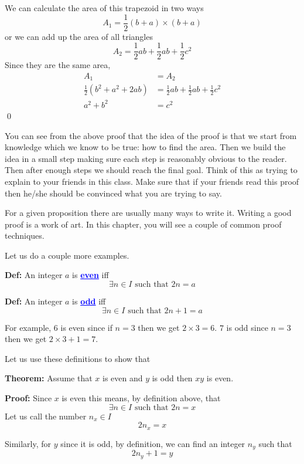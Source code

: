 \documentclass[a4paper, 12pt]{article}
\newcommand{\half}{\frac{1}{2}}
\newcommand{\definition}{\noindent\textbf{Def:} }
\newcommand{\theorem}{\noindent\textbf{Theorem:} }
\renewcommand{\proof}{\noindent\textbf{Proof:} }
\newcommand{\qedd}{\qed\newline}
\newcommand{\kwd}[1]{\textcolor{blue}{\textbf{\underline{#1}}}}
\newcommand{\st}{\text{ such that }}
\theoremstyle{examplestyle}
\begin{document}
\begin{multicols}{2}
\begin{center}
	\end{center}
	
	We can calculate the area of this trapezoid in two ways
	\[
		A_1 = \half(b+a)\times(b+a)
	\]
	or we can add up the area of all triangles
	\[
		A_2 = \half a b + \half a b + \half c^2
	\]
	Since they are the same area,
	\begin{align}
		A_1 &= A_2 \\
		\half\left(b^2 + a^2 +2ab\right) &= \half ab + \half ab + \half c^2\\
		a^2 + b^2 &= c^2
	\end{align}
	\qedd
	
You can see from the above proof that the idea of the proof is that we start from knowledge which we know to be true: how to find the area. Then we build the idea in a small step making sure each step is reasonably obvious to the reader. Then after enough steps we should reach the final goal. Think of this as trying to explain to your friends in this class. Make sure that if your friends read this proof then he/she should be convinced what you are trying to say.

For a given proposition there are usually many ways to write it. Writing a good proof is a work of art. In this chapter, you will see a couple of common proof techniques. 

Let us do a couple more examples.

\noindent\definition An integer $a$ is \kwd{even} iff $$\exists n \in I \st 2n = a$$

\noindent\definition An integer $a$ is \kwd{odd} iff $$\exists n \in I \st 2n+1 = a$$

For example, $6$ is even since if $n=3$ then we get $2\times 3 = 6$. $7$ is odd since $n=3$ then we get $2\times3 + 1 = 7$.

Let us use these definitions to show that

\noindent\theorem Assume that $x$ is even and $y$ is odd then $xy$ is even.

\noindent\proof
Since $x$ is even this means, by definition above, that
\[
	\exists n \in I \st 2n = x
\]
Let us call the number $n_x \in I$
\[
	2n_x = x
\]

Similarly, for $y$ since it is odd, by definition, we can find an integer $n_y$ such that
\[
	2n_y + 1 = y
\]


\end{multicols}
\end{document}

